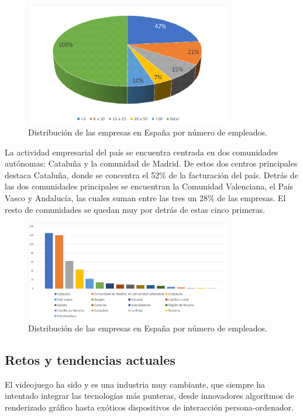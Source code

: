 \begin{figure}[h]
    \centering
    \includegraphics[width=0.8\textwidth]{images/estadodelarte/mercado/distribucion-tamano-esp}
    \caption{Distribución de las empresas en España por número de empleados.}
\end{figure}

La actividad empresarial del país se encuentra centrada en dos comunidades autónomas: Cataluña y la comunidad de Madrid. De estos dos centros principales destaca Cataluña, donde se concentra el 52\% de la facturación del país. Detrás de las dos comunidades principales se encuentran la Comunidad Valenciana, el País Vasco y Andalucía, las cuales suman entre las tres un 28\% de las empresas. El resto de comunidades se quedan muy por detrás de estas cinco primeras\cite{libro_blanco}.

\begin{figure}[h]
    \centering
    \includegraphics[width=0.8\textwidth]{images/estadodelarte/mercado/distribucion-comunidades-esp}
    \caption{Distribución de las empresas en España por número de empleados.}
\end{figure}

\subsection{Retos y tendencias actuales}
El videojuego ha sido y es una industria muy cambiante, que siempre ha intentado integrar las tecnologías más punteras, desde innovadores algoritmos de renderizado gráfico hasta exóticos dispositivos de interacción persona-ordenador.


